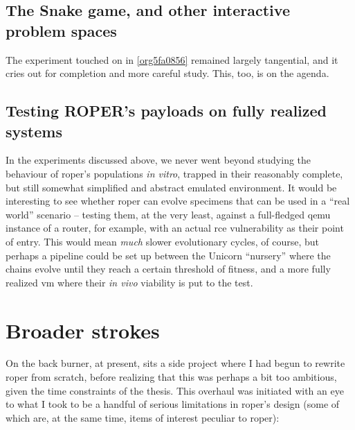\documentclass[12pt,glossary]{dalthesis}
\begin{document}
\subsection{The Snake game, and other interactive problem spaces}
\label{sec:org4a0a4c6}

The experiment touched on in \ref{org5fa0856} remained largely tangential,
and it cries out for completion and more careful study. This, too, is on the agenda. 

\subsection{Testing ROPER's payloads on fully realized systems}
\label{sec:org7e3d839}

In the experiments discussed above, we never went beyond studying the behaviour
of \gls{roper}'s populations \emph{in vitro}, trapped in their reasonably complete, but
still somewhat simplified and abstract emulated environment. It would be interesting
to see whether \gls{roper} can evolve specimens that can be used in a ``real world''
scenario -- testing them, at the very least, against a full-fledged \gls{qemu} instance
of a router, for example, with an actual \gls{rce} vulnerability as their point of
entry. This would mean \emph{much} slower evolutionary cycles, of course, but perhaps
a pipeline could be set up between the Unicorn ``nursery'' where the chains evolve 
until they reach a certain threshold of fitness, and a more fully realized \gls{vm}
where their \emph{in vivo} viability is put to the test. 


\section{Broader strokes}
\label{sec:org047aa83}

On the back burner, at present, sits a side project where I had begun to rewrite
\gls{roper} from scratch, before realizing that this was perhaps a bit too
ambitious, given the time constraints of the thesis. This overhaul was initiated
with an eye to what I took to be a handful of serious limitations in \gls{roper}'s
design (some of which are, at the same time, items of interest peculiar to \gls{roper}):
\end{document}
